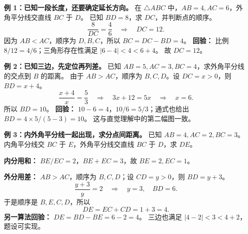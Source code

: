 \begin{examplebox}
\textbf{例 1：已知一段长度，还要确定延长方向。}
在 $\triangle ABC$ 中，$AB=4,AC=6$，外角平分线交直线 $BC$ 于 $D$。
已知 $BD=8$，求 $DC$，并判断点的顺序。
\[
 \frac8{DC}=\frac46\quad\Longrightarrow\quad DC=12.
\]
因为 $AB<AC$，顺序为 $D,B,C$，所以 $BC=DC-BD=4$。
\textbf{回验：} 比例 $8/12=4/6$；三角形存在性满足 $|6-4|<4<6+4$。
故 $\boxed{DC=12}$。

\tcbbreak
\textbf{例 2：已知三边，先定位再列差。}
已知 $AB=5,AC=3,BC=4$，求外角平分线的交点到 $B$ 的距离。
由于 $AB>AC$，顺序为 $B,C,D$。设 $DC=x>0$，则 $BD=x+4$。
\[
 \frac{x+4}{x}=\frac53
 \quad\Longrightarrow\quad 3x+12=5x
 \quad\Longrightarrow\quad x=6.
\]
所以 $\boxed{BD=10}$。
\textbf{回验：} $10-6=4$，$10/6=5/3$；通式也给出 $BD=4\times5/(5-3)=10$。
这与直觉理解中的第二幅图一致。

\textbf{例 3：内外角平分线一起出现，求分点间距离。}
已知 $AB=4,AC=2,BC=3$。内角平分线交 $BC$ 于 $E$，外角平分线交直线 $BC$ 于 $D$，求 $DE$。

\textbf{内分用和：} $BE/EC=2$，$BE+EC=3$，故 $BE=2,EC=1$。

\textbf{外分用差：} $AB>AC$，顺序为 $B,C,D$；设 $CD=y>0$，则 $BD=y+3$。
\[
 \frac{y+3}{y}=2\quad\Longrightarrow\quad y=3,\quad BD=6.
\]
于是顺序是 $B,E,C,D$，所以
\[
 \boxed{DE=EC+CD=1+3=4}.
\]
\textbf{另一算法回验：} $DE=BD-BE=6-2=4$。
三边也满足 $|4-2|<3<4+2$，题设可实现。
\end{examplebox}
